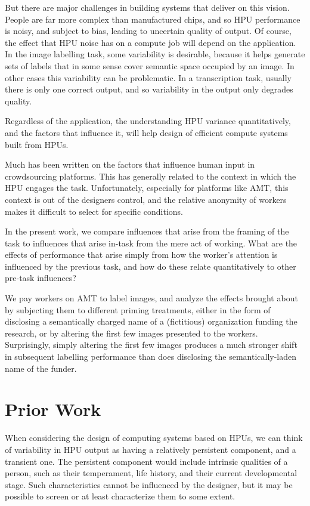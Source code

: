 \documentclass[letterpaper]{article}
\begin{document}
But there are major challenges in building systems that deliver on this 
vision\cite{kittur2008crowdsourcing}.  People are far more complex than manufactured chips, 
and so HPU performance is noisy, and subject to bias, leading to uncertain
quality of output.  Of course, the effect that HPU noise has on a compute job 
will depend on the application.
In the image labelling task, some variability is desirable, because it helps
generate sets of labels that in some sense cover semantic space occupied by an 
image.  In other cases this variability can be problematic.  In a 
transcription task, usually there is only one correct output, and so 
variability in the output only degrades quality.

Regardless of the application, the understanding HPU variance quantitatively,
and the factors that influence it, will help design of efficient compute 
systems built from HPUs.

Much has been written on the factors that influence human input in 
crowdsourcing platforms.  This has generally related to the context in which
the HPU engages the task.  Unfortunately, especially for platforms like AMT,
this context is out of the designers control, and the relative anonymity of
workers makes it difficult to select for specific conditions.

In the present work, we compare influences that arise from the framing of the
task to influences that arise in-task from the mere act of working.  What 
are the effects of performance that arise simply from how the worker's 
attention is influenced by the previous task, and how do these relate 
quantitatively to other pre-task influences?

We pay workers on AMT to label images, and analyze the effects brought about
by subjecting them to different priming treatments, either in the form of 
disclosing a semantically charged name of a (fictitious) organization 
funding the research, or by altering the first few images presented to the
workers.  Surprisingly, simply altering the first few images produces a much
stronger shift in subsequent labelling performance than does disclosing the 
semantically-laden name of the funder. 



\section*{Prior Work}


When considering the design of computing systems based on HPUs, we can think
of variability in HPU output as having a relatively persistent component,
and a transient one.  The persistent component would include intrinsic
qualities of a person, such as their temperament, life history, and their 
current developmental stage.  Such characteristics cannot be influenced by
the designer, but it may be possible to screen or at least characterize them 
to some extent.
\end{document}
